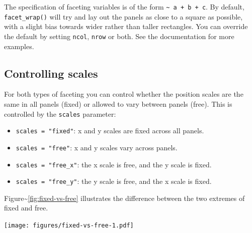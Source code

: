 The specification of faceting variables is of the form
\texttt{\textasciitilde{} a + b + c}. By default, \texttt{facet\_wrap()}
will try and lay out the panels as close to a square as possible, with a
slight bias towards wider rather than taller rectangles. You can
override the default by setting \texttt{ncol}, \texttt{nrow} or both.
See the documentation for more examples.

\subsection{Controlling scales}\label{sub:controlling-scales}

For both types of faceting you can control whether the position scales
are the same in all panels (fixed) or allowed to vary between panels
(free). This is controlled by the \texttt{scales} parameter:

\begin{itemize}
\itemsep1pt\parskip0pt
\item
  \texttt{scales = "fixed"}: x and y scales are fixed across all panels.
\item
  \texttt{scales = "free"}: x and y scales vary across panels.
\item
  \texttt{scales = "free\_x"}: the x scale is free, and the y scale is
  fixed.
\item
  \texttt{scales = "free\_y"}: the y scale is free, and the x scale is
  fixed.
\end{itemize}

\noindent Figure\textasciitilde{}\ref{fig:fixed-vs-free} illustrates the
difference between the two extremes of fixed and free.

\begin{Shaded}
\begin{Highlighting}[]
\StringTok{ } 
\StringTok{ }\NormalTok{(~}\StringTok{ }
\end{Highlighting}
\end{Shaded}

\texttt{[image: figures/fixed-vs-free-1.pdf]}

\begin{Shaded}
\begin{Highlighting}[]
\StringTok{ }\NormalTok{(~}\StringTok{ } \NormalTok{)}
\end{Highlighting}
\end{Shaded}

